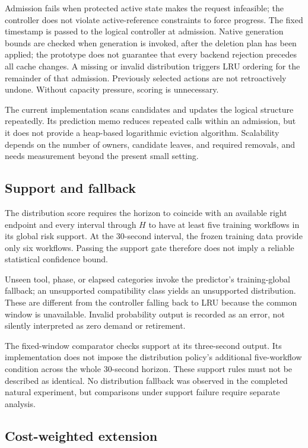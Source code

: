 \documentclass[sigconf, screen, review]{acmart}
\begin{document}
Admission fails when protected active state makes the request
infeasible; the controller does not violate active-reference constraints
to force progress. The fixed timestamp is passed to the logical
controller at admission. Native generation bounds are checked when
generation is invoked, after the deletion plan has been applied; the
prototype does not guarantee that every backend rejection precedes all
cache changes. A missing or invalid distribution triggers LRU ordering
for the remainder of that admission. Previously selected actions are not
retroactively undone. Without capacity pressure, scoring is unnecessary.

The current implementation scans candidates and updates the logical
structure repeatedly. Its prediction memo reduces repeated calls within
an admission, but it does not provide a heap-based logarithmic eviction
algorithm. Scalability depends on the number of owners, candidate
leaves, and required removals, and needs measurement beyond the present
small setting.

\subsection{Support and fallback}\label{support-and-fallback}

The distribution score requires the horizon to coincide with an
available right endpoint and every interval through \(H\) to have at
least five training workflows in its global risk support. At the
30-second interval, the frozen training data provide only six workflows.
Passing the support gate therefore does not imply a reliable statistical
confidence bound.

Unseen tool, phase, or elapsed categories invoke the predictor's
training-global fallback; an unsupported compatibility class yields an
unsupported distribution. These are different from the controller
falling back to LRU because the common window is unavailable. Invalid
probability output is recorded as an error, not silently interpreted as
zero demand or retirement.

The fixed-window comparator checks support at its three-second output.
Its implementation does not impose the distribution policy's additional
five-workflow condition across the whole 30-second horizon. These
support rules must not be described as identical. No distribution
fallback was observed in the completed natural experiment, but
comparisons under support failure require separate analysis.

\subsection{Cost-weighted extension}\label{cost-weighted-extension}
\end{document}
